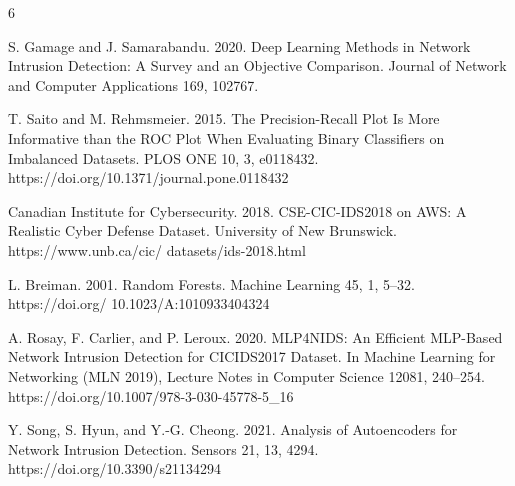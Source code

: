 \documentclass[sigconf,nonacm]{acmart}
\begin{document}
\clearpage

\begin{thebibliography}{6}

S. Gamage and J. Samarabandu. 2020. Deep Learning Methods in Network Intrusion Detection: A Survey and an Objective Comparison. Journal of Network and
Computer Applications 169, 102767.

T. Saito and M. Rehmsmeier. 2015. The Precision-Recall Plot Is More Informative
than the ROC Plot When Evaluating Binary Classifiers on Imbalanced Datasets.
PLOS ONE 10, 3, e0118432. https://doi.org/10.1371/journal.pone.0118432

Canadian Institute for Cybersecurity. 2018. CSE-CIC-IDS2018 on AWS: A Realistic
Cyber Defense Dataset. University of New Brunswick. https://www.unb.ca/cic/
datasets/ids-2018.html

L. Breiman. 2001. Random Forests. Machine Learning 45, 1, 5--32. https://doi.org/
10.1023/A:1010933404324

A. Rosay, F. Carlier, and P. Leroux. 2020. MLP4NIDS: An Efficient MLP-Based
Network Intrusion Detection for CICIDS2017 Dataset. In Machine Learning for
Networking (MLN 2019), Lecture Notes in Computer Science 12081, 240--254.
https://doi.org/10.1007/978-3-030-45778-5\_16

Y. Song, S. Hyun, and Y.-G. Cheong. 2021. Analysis of Autoencoders for Network
Intrusion Detection. Sensors 21, 13, 4294. https://doi.org/10.3390/s21134294

\end{thebibliography}
\end{document}
